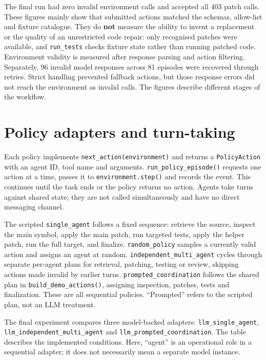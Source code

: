 \documentclass[12pt,a4paper,oneside]{report}
\begin{document}
The final run had zero invalid environment calls and accepted all 403 patch calls. These figures mainly show that submitted actions matched the schemas, allow-list and fixture catalogue. They do \textbf{not} measure the ability to invent a replacement or the quality of an unrestricted code repair: only recognised patches were available, and \texttt{run\allowbreak\_tests} checks fixture state rather than running patched code. Environment validity is measured after response parsing and action filtering. Separately, 96 invalid model responses across 81 episodes were recovered through retries. Strict handling prevented fallback actions, but those response errors did not reach the environment as invalid calls. The figures describe different stages of the workflow.

\section{Policy adapters and turn-taking}
Each policy implements \texttt{next\allowbreak\_action(environment)} and returns a \texttt{PolicyAction} with an agent ID, tool name and arguments. \texttt{run\allowbreak\_policy\allowbreak\_episode()} requests one action at a time, passes it to \texttt{environment.step()} and records the event. This continues until the task ends or the policy returns no action. Agents take turns against shared state; they are not called simultaneously and have no direct messaging channel.

The scripted \texttt{single\allowbreak\_agent} follows a fixed sequence: retrieve the source, inspect the main symbol, apply the main patch, run targeted tests, apply the helper patch, run the full target, and finalize. \texttt{random\allowbreak\_policy} samples a currently valid action and assigns an agent at random. \texttt{independent\allowbreak\_multi\allowbreak\_agent} cycles through separate per-agent plans for retrieval, patching, testing or review, skipping actions made invalid by earlier turns. \texttt{prompted\allowbreak\_coordination} follows the shared plan in \texttt{build\allowbreak\_demo\allowbreak\_actions()}, assigning inspection, patches, tests and finalization. These are all sequential policies. “Prompted” refers to the scripted plan, not an LLM treatment.

The final experiment compares three model-backed adapters: \texttt{llm\allowbreak\_single\allowbreak\_agent}, \texttt{llm\allowbreak\_independent\allowbreak\_multi\allowbreak\_agent} and \texttt{llm\allowbreak\_prompted\allowbreak\_coordination}. The table describes the implemented conditions. Here, “agent” is an operational role in a sequential adapter; it does not necessarily mean a separate model instance.
\end{document}
